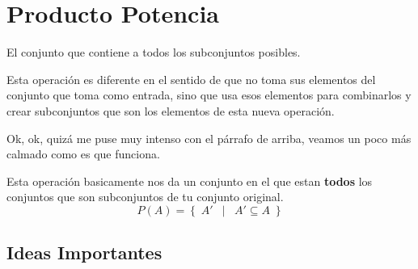 \documentclass[12pt, fleqn]{report}                             %
\DeclareMathOperator \Space     {\quad}                         %
\DeclareMathOperator \MiniSpace {\;}                            %
\newcommand \Such           {\MiniSpace | \MiniSpace}           %
\theoremstyle{break}                                            %
\newcommand{\Set}[1]            {\left\{ \; #1 \; \right\}}     %
\begin{document}
        \clearpage
        \section{Producto Potencia}

            El conjunto que contiene a todos los subconjuntos posibles. 

            Esta operación es diferente en el sentido de que no toma sus elementos del conjunto
            que toma como entrada, sino que usa esos elementos para combinarlos y crear subconjuntos
            que son los elementos de esta nueva operación.

            Ok, ok, quizá me puse muy intenso con el párrafo de arriba, veamos un poco más calmado
            como es que funciona.

            Esta operación basicamente nos da un conjunto en el que estan \textbf{todos} los
            conjuntos que son subconjuntos de tu conjunto original.
            \begin{equation*}
                P(A) = \Set{ A' \Such A' \subseteq A}
            \end{equation*}


            \clearpage
            \subsection{Ideas Importantes}
\end{document}
